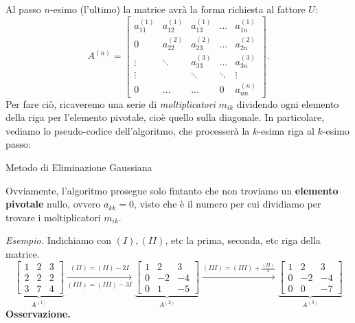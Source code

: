 Al passo $\displaystyle n$-esimo (l'ultimo) la matrice avrà la forma richiesta al fattore $U$:
\begin{equation}
  A^{(n)} =
  \begin{bmatrix}
      a^{(1)}_{11} & a^{(1)}_{12} & a^{(1)}_{13} & \dotsc & a^{(1)}_{1n} \\
      0             & a^{(2)}_{22} & a^{(2)}_{23} & \dotsc & a^{(2)}_{2n} \\
      \vdots        & \ddots        & a^{(3)}_{33} & \dotsc & a^{(3)}_{3n} \\
      \vdots        &               & \ddots        & \ddots & \vdots        \\
      0             & \dotsc        & \dotsc        & 0      & a^{(n)}_{nn}
  \end{bmatrix}.
  \label{eq:costruzione-U-con-MEG}
\end{equation}
Per fare ciò, ricaveremo una serie di \textit{moltiplicatori} $m_{ik}$ dividendo ogni elemento della riga per l'elemento pivotale, cioè quello sulla diagonale.
In particolare, vediamo lo pseudo-codice dell'algoritmo, che processerà la $k$-esima riga al $k$-esimo passo:

\begin{algo}
    \caption{Metodo di Eliminazione Gaussiana}
\end{algo}
Ovviamente, l'algoritmo prosegue solo fintanto che non troviamo un \textbf{elemento pivotale} nullo, ovvero $a_{kk} = 0$, visto che è il numero per cui dividiamo per trovare i moltiplicatori $m_{ik}$.


\textit{Esempio.}
Indichiamo con $(I), (II)$, etc la prima, seconda, etc riga della matrice.
\begin{equation*}
\underbrace{\begin{bmatrix}
1 & 2 & 3\\
2 & 2 & 2\\
3 & 7 & 4
\end{bmatrix}}_{A^{(1)}}\xrightarrow[(III)=(III)-3I]{(II)=(II)-2I}\underbrace{\begin{bmatrix}
1 & 2 & 3\\
0 & -2 & -4\\
0 & 1 & -5
\end{bmatrix}}_{A^{(2)}}\xrightarrow{(III)=(III)+\frac{(II)}{2}}\underbrace{\begin{bmatrix}
1 & 2 & 3\\
0 & -2 & -4\\
0 & 0 & -7
\end{bmatrix}}_{A^{(3)}}
\end{equation*}
\textbf{Osservazione. }

